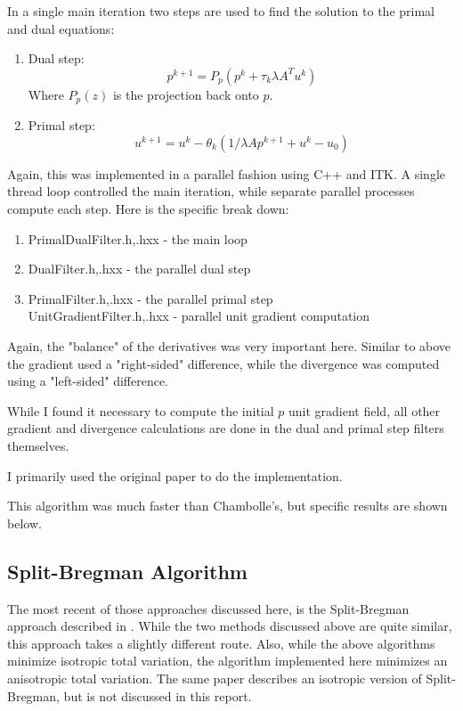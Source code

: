 \documentclass[11pt]{article}
\begin{document}
In a single main iteration two steps are used to find the solution to the primal and dual equations:
\begin{enumerate}
\item Dual step:
\begin{equation}
p^{k+1} = P_p(p^k + \tau_k \lambda A^T u^k)
\label{pd:dual}
\end{equation}
Where $P_p(z)$ is the projection back onto $p$.
\item Primal step:
\begin{equation}
u^{k+1} = u^k - \theta_k (1/\lambda Ap^{k+1} + u^k-u_0)
\label{pd:primal}
\end{equation}
\end{enumerate}

Again, this was implemented in a parallel fashion using C++ and ITK.
A single thread loop controlled the main iteration, while separate parallel processes compute each step.
Here is the specific break down:
\begin{enumerate}
\item PrimalDualFilter.h,.hxx - the main loop
\item DualFilter.h,.hxx - the parallel dual step
\item PrimalFilter.h,.hxx - the parallel primal step\\
UnitGradientFilter.h,.hxx - parallel unit gradient computation
\end{enumerate}

Again, the "balance" of the derivatives was very important here.
Similar to above the gradient used a "right-sided" difference, while the divergence was computed using a "left-sided" difference.

While I found it necessary to compute the initial $p$ unit gradient field, all other gradient and divergence calculations are done in the dual and primal step filters themselves.

I primarily used the original paper to do the implementation.

This algorithm was much faster than Chambolle's, but specific results are shown below.

\subsection{Split-Bregman Algorithm}
The most recent of those approaches discussed here, is the Split-Bregman approach described in \cite{goldstein2009split}.  
While the two methods discussed above are quite similar, this approach takes a slightly different route.
Also, while the above algorithms minimize isotropic total variation, the algorithm implemented here minimizes an anisotropic total variation.
The same paper \cite{goldstein2009split} describes an isotropic version of Split-Bregman, but is not discussed in this report.
\end{document}

